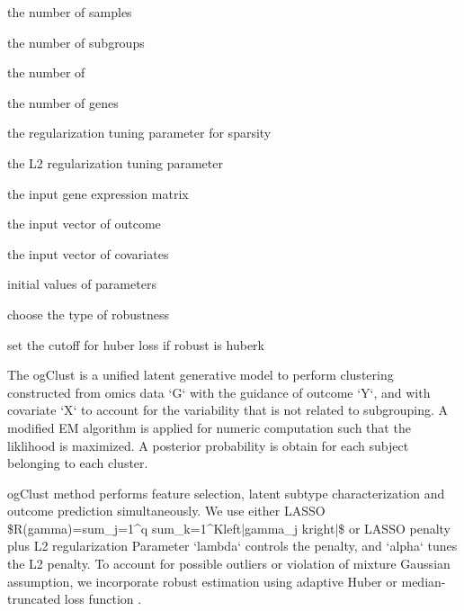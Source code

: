 \documentclass[a4paper]{book}
\begin{document}
%
\begin{Arguments}
\begin{ldescription}
\item[\code{n}] the number of samples

\item[\code{K}] the number of subgroups

\item[\code{np}] the number of

\item[\code{NG}] the number of genes

\item[\code{lambda}] the regularization tuning parameter for sparsity

\item[\code{alpha}] the L2 regularization tuning parameter

\item[\code{G}] the input gene expression matrix

\item[\code{Y}] the input vector of outcome

\item[\code{X}] the input vector of covariates

\item[\code{theta\_int}] initial values of parameters

\item[\code{robust}] choose the type of robustness

\item[\code{tau}] set the cutoff for huber loss if robust is huberk
\end{ldescription}
\end{Arguments}
%
\begin{Details}\relax
The ogClust is a unified latent generative model to perform clustering constructed
from omics data `G` with the guidance of outcome `Y`, and with covariate `X` to account for
the variability that is not related to subgrouping. A modified EM algorithm is applied for
numeric computation such that the liklihood is maximized. A posterior probability is obtain
for each subject belonging to each cluster.

ogClust method performs feature selection, latent subtype characterization and outcome prediction simultaneously.
We use either LASSO \$R(\bsl{}gamma)=\bsl{}sum\_j=1\textasciicircum{}q \bsl{}sum\_k=1\textasciicircum{}K\bsl{}left|\bsl{}gamma\_j k\bsl{}right|\$ or LASSO penalty plus L2 regularization
Parameter `lambda` controls the penalty, and `alpha` tunes the L2 penalty. To account for possible outliers or violation of mixture Gaussian assumption, we incorporate robust
estimation using adaptive Huber \Cite{sun2019adaptive} or median-truncated loss function \Cite{chi2019median}.
\end{Details}
\end{document}
